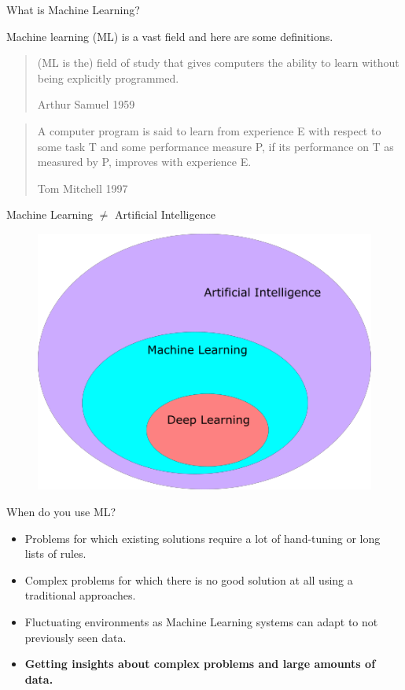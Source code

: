 \documentclass[11pt, aspectratio=43]{beamer}
\begin{document}
\begin{frame}{What is Machine Learning?}

	Machine learning (ML) is a vast field and here are some definitions.
	
\begin{quote}
	(ML is the) field of study that gives computers the ability to learn without being explicitly programmed.
	
	Arthur Samuel 1959
\end{quote}	
	
	

\begin{quote}
	A computer program is said to learn from experience E with respect to some task T and some performance measure P, if its performance on T as measured by P, improves with experience E.
	
	Tom Mitchell 1997
\end{quote}



\end{frame}
\begin{frame}{Machine Learning $\ne$ Artificial Intelligence}	
	
	\begin{figure}[h]
	\centering
	\includegraphics[scale=0.55]{Figures/fig_ml_vs_ai.png}
\end{figure}
	
\end{frame}

\begin{frame}{When do you use ML?}
	\begin{itemize}
		\item Problems for which existing solutions require a lot of hand-tuning or long lists of rules.
		\item Complex problems for which there is no good solution at all using a traditional approaches.
		\item Fluctuating environments as Machine Learning systems can adapt to not previously seen data.
		\item \textbf{Getting insights about complex problems and large amounts of data.}	
	\end{itemize}

\end{frame}
	
\end{document}
